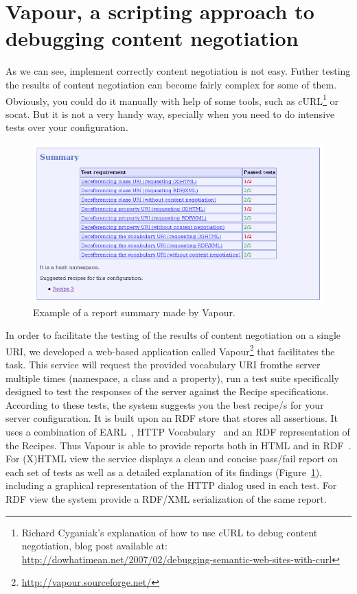 \documentclass{../templates/llncs}
\begin{document}

\section{\label{sec:vapour}Vapour, a scripting approach to debugging content negotiation}

As we can see, implement correctly content negotiation is not easy. Futher 
testing the results of content negotiation can become fairly complex for some 
of them. Obviously, you could do it manually with help of some tools, such as 
cURL\footnote{Richard Cyganiak's explanation of how to use cURL to debug content negotiation, 
blog post available at: \url{http://dowhatimean.net/2007/02/debugging-semantic-web-sites-with-curl}}
or socat. But it is not a very handy way, specially when you need to do 
intensive tests over your configuration.

\begin{figure}[t]
 \centering
 \includegraphics[width=12cm]{images/report-summary.png}
 \caption{\label{fig:report-summary}Example of a report summary made by Vapour.}
\end{figure}

In order to facilitate the testing of the results of content negotiation on a single 
URI, we developed a web-based application called Vapour\footnote{\url{http://vapour.sourceforge.net/}}
that facilitates the task. This service will request the provided vocabulary 
URI fromthe server multiple times (namespace, a class and a property), run a 
test suite specifically designed to test the responses of the server against 
the Recipe specifications. According to these tests, the system suggests you the 
best recipe/s for your server configuration. It is built upon an RDF store %
that stores all assertions. It uses a combination of EARL~\cite{EARL}, HTTP
Vocabulary~\cite{Koch2007} and an RDF representation of the Recipes. Thus Vapour 
is able to provide reports both in HTML and in RDF~\cite{RDF}. For (X)HTML view 
the service displays a clean and concise pass/fail report on each set of tests 
as  well as a detailed explanation of its  findings (Figure~\ref{fig:report-summary}), 
including a graphical representation of the HTTP dialog used in each test.
For RDF view %
the system provide a RDF/XML serialization of the same report.
\end{document}

